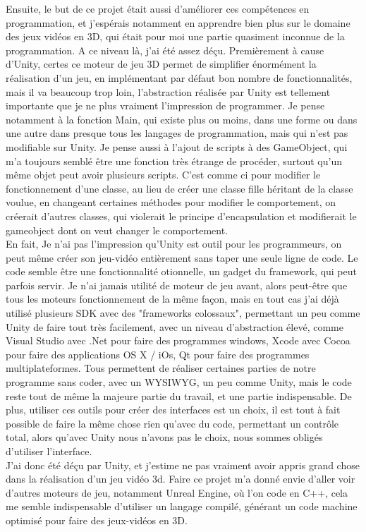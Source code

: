 \documentclass[12pt]{article}
\begin{document}
Ensuite, le but de ce projet était aussi d'améliorer ces compétences en programmation, et j'espérais notamment en apprendre bien plus sur le domaine des jeux vidéos en 3D, qui était pour moi une partie quasiment inconnue de la programmation. A ce niveau là, j'ai été assez déçu. Premièrement à cause d'Unity, certes ce moteur de jeu 3D permet de simplifier énormément la réalisation d'un jeu, en implémentant par défaut bon nombre de fonctionnalités, mais il va beaucoup trop loin, l'abstraction réalisée par Unity est tellement importante que je ne plus vraiment l'impression de programmer. Je pense notamment à la fonction Main, qui existe plus ou moins, dans une forme ou dans une autre dans presque tous les langages de programmation, mais qui n'est pas modifiable sur Unity. Je pense aussi à l'ajout de scripts à des GameObject, qui m'a toujours semblé être une fonction très étrange de procéder, surtout qu'un même objet peut avoir plusieurs scripts. C'est comme ci pour modifier le fonctionnement d'une classe, au lieu de créer une classe fille héritant de la classe voulue, en changeant certaines méthodes pour modifier le comportement, on créerait d'autres classes, qui violerait le principe d'encapsulation et modifierait le gameobject dont on veut changer le comportement.\\
En fait, Je n'ai pas l'impression qu'Unity est outil pour les programmeurs, on peut même créer son jeu-vidéo entièrement sans taper une seule ligne de code. Le code semble être une fonctionnalité otionnelle, un gadget du framework, qui peut parfois servir. Je n'ai jamais utilité de moteur de jeu avant, alors peut-être que tous les moteurs fonctionnement de la même façon, mais en tout cas j'ai déjà utilisé plusieurs SDK avec des "frameworks colossaux", permettant un peu comme Unity de faire tout très facilement, avec un niveau d'abstraction élevé, comme Visual Studio avec .Net pour faire des programmes windows, Xcode avec Cocoa pour faire des applications OS X / iOs, Qt pour faire des programmes multiplateformes. Tous permettent de réaliser certaines parties de notre programme sans coder, avec un WYSIWYG, un peu comme Unity, mais le code reste tout de même la majeure partie du travail, et une partie indispensable. De plus, utiliser ces outils pour créer des interfaces est un choix, il est tout à fait possible de faire la même chose rien qu'avec du code, permettant un contrôle total, alors qu'avec Unity nous n'avons pas le choix, nous sommes obligés d'utiliser l'interface.\\
J'ai donc été déçu par Unity, et j'estime ne pas vraiment avoir appris grand chose dans la réalisation d'un jeu vidéo 3d. Faire ce projet m'a donné envie d'aller voir d'autres moteurs de jeu, notamment Unreal Engine, où l'on code en C++, cela me semble indispensable d'utiliser un langage compilé, générant un code machine optimisé pour faire des jeux-vidéos en 3D.\\
\end{document}
